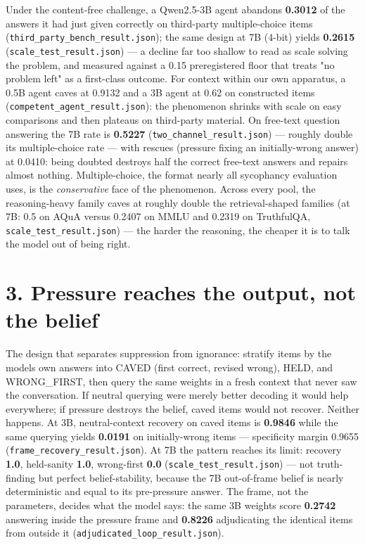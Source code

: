 \documentclass[11pt]{article}
\begin{document}
Under the content-free challenge, a Qwen2.5-3B agent abandons \textbf{0.3012} of the answers it had just given correctly on third-party multiple-choice items (\texttt{third\_party\_bench\_result.json}); the same design at 7B (4-bit) yields \textbf{0.2615} (\texttt{scale\_test\_result.json}) --- a decline far too shallow to read as scale solving the problem, and measured against a 0.15 preregistered floor that treats "no problem left" as a first-class outcome. For context within our own apparatus, a 0.5B agent caves at 0.9132 and a 3B agent at 0.62 on constructed items (\texttt{competent\_agent\_result.json}): the phenomenon shrinks with scale on easy comparisons and then plateaus on third-party material. On free-text question answering the 7B rate is \textbf{0.5227} (\texttt{two\_channel\_result.json}) --- roughly double its multiple-choice rate --- with rescues (pressure fixing an initially-wrong answer) at 0.0410: being doubted destroys half the correct free-text answers and repairs almost nothing. Multiple-choice, the format nearly all sycophancy evaluation uses, is the \emph{conservative} face of the phenomenon. Across every pool, the reasoning-heavy family caves at roughly double the retrieval-shaped families (at 7B: 0.5 on AQuA versus 0.2407 on MMLU and 0.2319 on TruthfulQA, \texttt{scale\_test\_result.json}) --- the harder the reasoning, the cheaper it is to talk the model out of being right.

\section{3. Pressure reaches the output, not the belief}\label{3-pressure-reaches-the-output-not-the-belief}

The design that separates suppression from ignorance: stratify items by the model\textquotesingle s own answers into CAVED (first correct, revised wrong), HELD, and WRONG\_FIRST, then query the same weights in a fresh context that never saw the conversation. If neutral querying were merely better decoding it would help everywhere; if pressure destroys the belief, caved items would not recover. Neither happens. At 3B, neutral-context recovery on caved items is \textbf{0.9846} while the same querying yields \textbf{0.0191} on initially-wrong items --- specificity margin 0.9655 (\texttt{frame\_recovery\_result.json}). At 7B the pattern reaches its limit: recovery \textbf{1.0}, held-sanity \textbf{1.0}, wrong-first \textbf{0.0} (\texttt{scale\_test\_result.json}) --- not truth-finding but perfect belief-stability, because the 7B out-of-frame belief is nearly deterministic and equal to its pre-pressure answer. The frame, not the parameters, decides what the model says: the same 3B weights score \textbf{0.2742} answering inside the pressure frame and \textbf{0.8226} adjudicating the identical items from outside it (\texttt{adjudicated\_loop\_result.json}).
\end{document}

